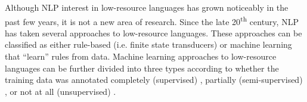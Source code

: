 Although NLP interest in low-resource languages has grown noticeably in the past few years, it is not a new area of research. Since the late 20\textsuperscript{th} century, NLP has taken several approaches to low-resource languages. These approaches can be classified as either rule-based (i.e. finite state transducers) \citep{cotterell_labeled_2015,forsberg_learning_2016,moeller_neural_2018,moeller_improving_2019} or machine learning that ``learn'' rules from data. Machine learning approaches to low-resource languages can be further divided into three types according to whether the training data was annotated completely (supervised) \citep{bergmanis_training_2017,sudhakar_experiments_2017,makarov_align_2017,liu_morphological_2018,makarov_uzh_2018}, partially (semi-supervised) \citep{ahlberg_semi-supervised_2014}, or not at all (unsupervised) \citep{moon_unsupervised_2009,palmer_computational_2010,kirschenbaum_unsupervised_2012,soricut_unsupervised_2015}. 

